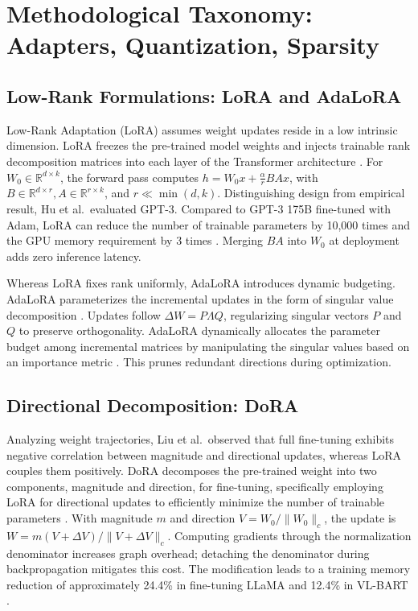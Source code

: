 \documentclass[11pt,a4paper]{article}
\begin{document}
\section{Methodological Taxonomy: Adapters, Quantization, Sparsity}

\subsection{Low-Rank Formulations: LoRA and AdaLoRA}
Low-Rank Adaptation (LoRA) assumes weight updates reside in a low intrinsic dimension. LoRA freezes the pre-trained model weights and injects trainable rank decomposition matrices into each layer of the Transformer architecture \cite{hu2021lora}. For $W_0 \in \mathbb{R}^{d \times k}$, the forward pass computes $h = W_0 x + \frac{\alpha}{r} B A x$, with $B \in \mathbb{R}^{d \times r}, A \in \mathbb{R}^{r \times k}$, and $r \ll \min(d, k)$. Distinguishing design from empirical result, Hu et al.\ evaluated GPT-3. Compared to GPT-3 175B fine-tuned with Adam, LoRA can reduce the number of trainable parameters by 10,000 times and the GPU memory requirement by 3 times \cite{hu2021lora}. Merging $BA$ into $W_0$ at deployment adds zero inference latency.

Whereas LoRA fixes rank uniformly, AdaLoRA introduces dynamic budgeting. AdaLoRA parameterizes the incremental updates in the form of singular value decomposition \cite{zhang2023adalora}. Updates follow $\Delta W = P \Lambda Q$, regularizing singular vectors $P$ and $Q$ to preserve orthogonality. AdaLoRA dynamically allocates the parameter budget among incremental matrices by manipulating the singular values based on an importance metric \cite{zhang2023adalora}. This prunes redundant directions during optimization.

\subsection{Directional Decomposition: DoRA}
Analyzing weight trajectories, Liu et al.\ observed that full fine-tuning exhibits negative correlation between magnitude and directional updates, whereas LoRA couples them positively. DoRA decomposes the pre-trained weight into two components, magnitude and direction, for fine-tuning, specifically employing LoRA for directional updates to efficiently minimize the number of trainable parameters \cite{liu2024dora}. With magnitude $m$ and direction $V = W_0 / \|W_0\|_c$, the update is $W = m (V + \Delta V) / \|V + \Delta V\|_c$. Computing gradients through the normalization denominator increases graph overhead; detaching the denominator during backpropagation mitigates this cost. The modification leads to a training memory reduction of approximately 24.4\% in fine-tuning LLaMA and 12.4\% in VL-BART \cite{liu2024dora}.
\end{document}
